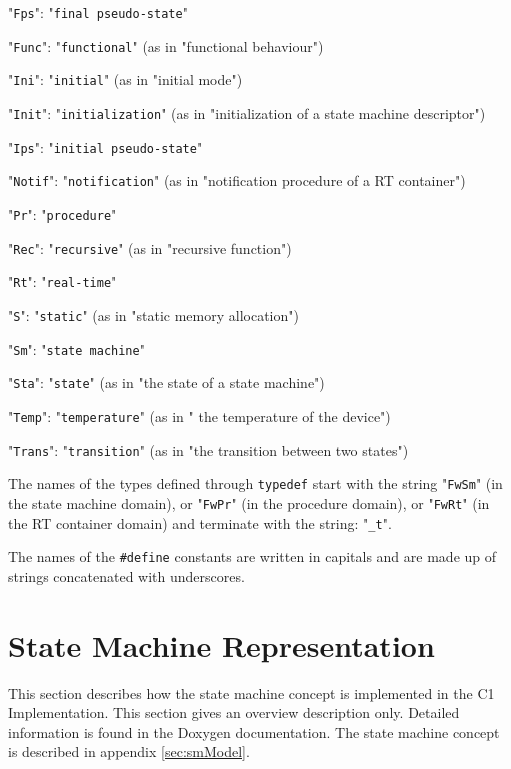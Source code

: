 \documentclass[a4paper,10pt]{article}
\let\stdsection\section
\renewcommand\section{\newpage\stdsection}
\newenvironment{fw_itemize}						%
{\begin{itemize}
  \setlength{\itemsep}{1mm}
  \setlength{\parskip}{0pt}
  \setlength{\parsep}{0pt}}
{\end{itemize}}
\begin{document}
\begin{fw_itemize}
\item "\texttt{Fps}": "\texttt{final pseudo-state}"
\item "\texttt{Func}": "\texttt{functional}" (as in "functional behaviour")
\item "\texttt{Ini}": "\texttt{initial}" (as in "initial mode")
\item "\texttt{Init}": "\texttt{initialization}" (as in "initialization of a state machine descriptor")
\item "\texttt{Ips}": "\texttt{initial pseudo-state}"
\item "\texttt{Notif}": "\texttt{notification}" (as in "notification procedure of a RT container")
\item "\texttt{Pr}": "\texttt{procedure}"
\item "\texttt{Rec}": "\texttt{recursive}" (as in "recursive function")
\item "\texttt{Rt}": "\texttt{real-time}" 
\item "\texttt{S}": "\texttt{static}" (as in "static memory allocation")
\item "\texttt{Sm}": "\texttt{state machine}"
\item "\texttt{Sta}": "\texttt{state}" (as in "the state of a state machine")
\item "\texttt{Temp}": "\texttt{temperature}" (as in " the temperature of the device")
\item "\texttt{Trans}": "\texttt{transition}" (as in "the transition between two states")
\end{fw_itemize}

The names of the types defined through \texttt{typedef} start with the string "\texttt{FwSm}" (in
the state machine domain), or "\texttt{FwPr}" (in the procedure domain), or "\texttt{FwRt}" (in the RT container domain) and terminate with the string: "\texttt{\_t}".

The names of the \texttt{\#define} constants are written in capitals and are made 
up of strings concatenated with underscores.



\section{State Machine Representation}
This section describes how the state machine concept is implemented in the C1 Implementation. 
This section gives an overview description only. Detailed information is found in the 
Doxygen documentation. The state machine concept is described in appendix \ref{sec:smModel}.
\end{document}
